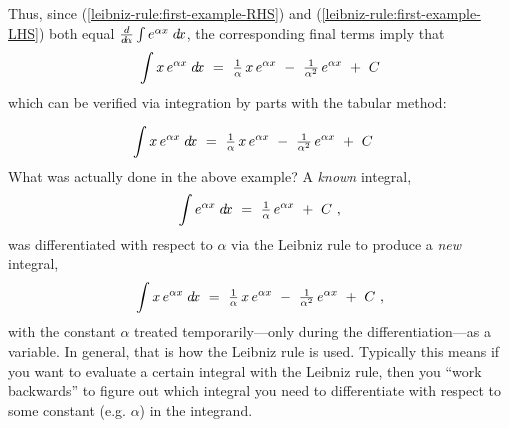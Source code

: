 Thus, since (\ref{leibniz-rule:first-example-RHS}) and
(\ref{leibniz-rule:first-example-LHS}) both equal $\frac{d}{d\!\alpha}
\int e^{\alpha x}\;d\!x$, the corresponding final terms imply that
\[
\int x\,e^{\alpha x}\;d\!x ~=~
\tfrac{1}{\alpha}\,x\,e^{\alpha x} ~-~ \tfrac{1}{\alpha^2}\,e^{\alpha x} ~+~ C
\]
which can be verified via integration by parts with the tabular method:

\begin{center}
\end{center}
\[
\int x\,e^{\alpha x}\;d\!x ~=~
\tfrac{1}{\alpha}\,x\,e^{\alpha x} ~-~ \tfrac{1}{\alpha^2}\,e^{\alpha x} ~+~ C\quad\relax
\]
\newpage
\noindent What was actually done in the above example? A \emph{known} integral,
\[
\int e^{\alpha x}\;d\!x ~=~ \tfrac{1}{\alpha}\,e^{\alpha x} ~+~ C ~,
\]
was differentiated with respect to $\alpha$ via the Leibniz rule to produce a
\emph{new} integral,
\[
\int x\,e^{\alpha x}\;d\!x ~=~
\tfrac{1}{\alpha}\,x\,e^{\alpha x} ~-~ \tfrac{1}{\alpha^2}\,e^{\alpha x} ~+~ C ~,
\]
with the constant $\alpha$ treated temporarily---only during the
differentiation---as a variable. In general, that is how the Leibniz rule is
used. Typically this means if you want to evaluate a certain integral with the
Leibniz rule, then you ``work backwards'' to figure out which integral you need
to differentiate with respect to some constant (e.g. $\alpha$) in the integrand.

